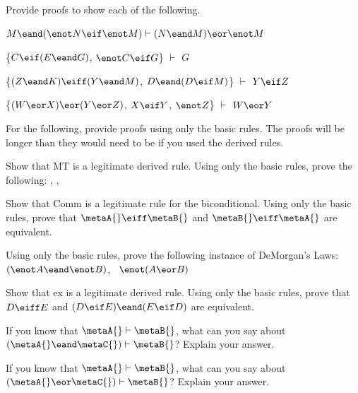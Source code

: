 \solutions
\problempart
\label{pr.solvedSLproofs2}
Provide proofs to show each of the following.
\begin{earg}
\item $M \eand (\enot N \eif \enot M) \vdash (N \eand M) \eor \enot M$
\item \{$C\eif(E\eand G)$, $\enot C \eif G$\} $\vdash$ $G$
\item \{$(Z\eand K)\eiff(Y\eand M)$, $D\eand(D\eif M)$\} $\vdash$ $Y\eif Z$
\item \{$(W \eor X) \eor (Y \eor Z)$, $X\eif Y$, $\enot Z$\} $\vdash$ $W\eor Y$
\end{earg}



\problempart
For the following, provide proofs using only the basic rules. The proofs will be longer than they would need to be if you used the derived rules.
\begin{earg}
\item Show that MT is a legitimate derived rule. Using only the basic rules, prove the following: \metaA{}\eif\metaB{}, \enot\metaB{}, \therefore\ \enot\metaA{}
\item Show that Comm is a legitimate rule for the biconditional. Using only the basic rules, prove that $\metaA{}\eiff\metaB{}$ and $\metaB{}\eiff\metaA{}$ are equivalent.
\item Using only the basic rules, prove the following instance of DeMorgan's Laws: $(\enot A \eand \enot B)$, \therefore\ $\enot(A \eor B)$
\item Show that {\eiff}{ex} is a legitimate derived rule. Using only the basic rules, prove that $D\eiff E$ and $(D\eif E)\eand(E\eif D)$ are equivalent.
\end{earg}




\problempart
\begin{earg}
\item If you know that $\metaA{}\vdash\metaB{}$, what can you say about $(\metaA{}\eand\metaC{})\vdash\metaB{}$? Explain your answer.
\item If you know that $\metaA{}\vdash\metaB{}$, what can you say about $(\metaA{}\eor\metaC{})\vdash\metaB{}$? Explain your answer.
\end{earg}

